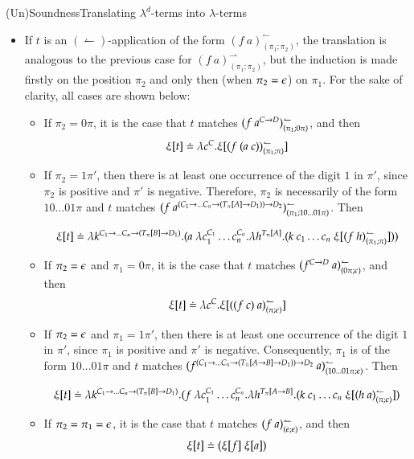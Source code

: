 \documentclass[9pt]{beamer}
\begin{document}
\begin{frame}{(Un)Soundness}{Translating $\lambda^d$-terms into $\lambda$-terms}

\begin{itemize}
\item If $t$ is an $(\leftharpoonup)$-application of the form $(f \ a)^{\leftharpoonup}_{(\pi_1;\pi_2)}$, the translation is analogous to the previous case for $(f \ a)^{\rightharpoonup}_{(\pi_1;\pi_2)}$, but the induction is made firstly on the position $\pi_2$ and only then (when $\pi_2 = \epsilon$) on $\pi_1$. For the sake of clarity, all cases are shown below:
	\begin{itemize}
	\item If $\pi_2 = 0\pi$, it is the case that $t$ matches $(f \ a^{C \rightarrow D})^{\leftharpoonup}_{(\pi_1;0\pi)}$, and then
	$$\tP{t} \defEq \lambda c^C. \tP{(f \ (a \ c))^{\leftharpoonup}_{(\pi_1;\pi)}}$$
	\item If $\pi_2 = 1\pi'$, then there is at least one occurrence of the digit $1$ in $\pi'$, since $\pi_2$ is positive and $\pi'$ is negative. Therefore, $\pi_2$ is necessarily of the form $10\ldots01\pi$ and $t$ matches $(f \ a^{(C_1 \rightarrow \ldots C_n \rightarrow (T_{\pi}[A] \rightarrow D_1))\rightarrow D_2})^{\leftharpoonup}_{(\pi_1;10\ldots01\pi)}$. Then
	\begin{scriptsize}
	$$\tP{t} \defEq \lambda k^{C_1 \imp \ldots C_n \imp (T_{\pi}[B] \imp D_1)}. (a \ \lambda c_1^{C_1} \ldots c_n^{C_n}. \lambda h^{T_{\pi}[A]}. (k \ c_1 \ldots c_n \ \tP{(f \ h)^{\leftharpoonup}_{(\pi_1;\pi)}}))$$
	\end{scriptsize}
	\item If $\pi_2 = \epsilon$ and $\pi_1 = 0\pi$, it is the case that $t$ matches $(f^{C \imp D} \ a)^{\leftharpoonup}_{(0\pi;\eS)}$, and then
	$$\tP{t} \defEq \lambda c^C. \tP{((f \ c) \ a)^{\leftharpoonup}_{(\pi;\eS)}}$$
	\item  If $\pi_2 = \epsilon$ and $\pi_1 = 1\pi'$, then there is at least one occurrence of the digit $1$ in $\pi'$, since $\pi_1$ is positive and $\pi'$ is negative. Consequently, $\pi_1$ is of the form $10\ldots01\pi$ and $t$ matches $(f^{(C_1 \imp \ldots C_n \imp (T_{\pi}[A \imp B] \imp D_1)) \imp D_2} \ a)^{\leftharpoonup}_{(10\ldots01\pi;\eS)}$. Then
	\begin{scriptsize}
	$$\tP{t} \defEq \lambda k^{C_1 \imp \ldots C_n \imp (T_{\pi}[B] \imp D_1)}. (f \ \lambda c_1^{C_1} \ldots c_n^{C_n}. \lambda h^{T_{\pi}[A \imp B]}. (k \ c_1 \ldots c_n \ \tP{(h \ a)^{\leftharpoonup}_{(\pi;\eS)}})$$
	\end{scriptsize}
	\item If $\pi_2 = \pi_1 = \epsilon$, it is the case that $t$ matches $(f \ a)^{\leftharpoonup}_{(\eS;\eS)}$, and then
	$$\xi[t] \doteq (\xi[f] \ \xi[a])$$	
	\end{itemize}
\end{itemize}
\end{frame}
\end{document}
